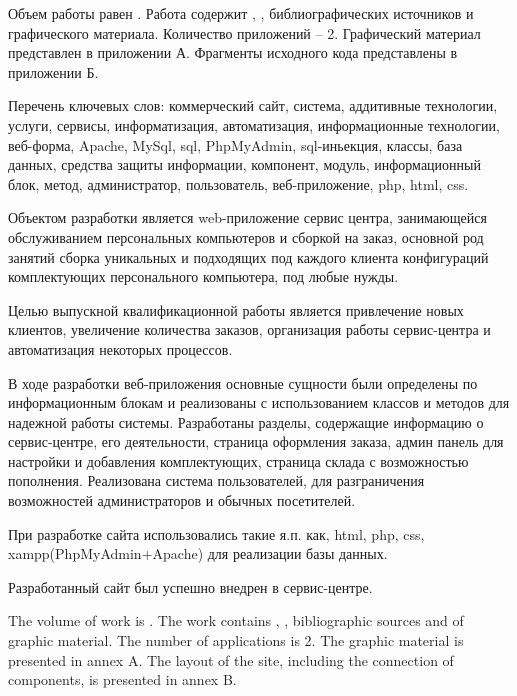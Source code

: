 
Объем работы равен . Работа содержит , ,  библиографических источников и  графического материала. Количество приложений – 2. Графический материал представлен в приложении А. Фрагменты исходного кода представлены в приложении Б.

Перечень ключевых слов: коммерческий сайт, система, аддитивные технологии, услуги, сервисы, информатизация, автоматизация, информационные технологии, веб-форма,  Apache, MySql, sql, PhpMyAdmin, sql-иньекция, классы, база данных, средства защиты информации, компонент, модуль, информационный блок, метод,  администратор, пользователь, веб-приложение, php, html, css.

Объектом разработки является web-приложение сервис центра,  занимающейся обслуживанием персональных компьютеров и сборкой на заказ, основной род занятий сборка уникальных и подходящих под каждого клиента конфигураций комплектующих персонального компьютера, под любые нужды.

Целью выпускной квалификационной работы является привлечение новых клиентов, увеличение количества заказов, организация работы сервис-центра и автоматизация некоторых процессов.

В ходе разработки веб-приложения основные сущности были определены по информационным блокам и реализованы с использованием классов и методов для надежной работы системы. Разработаны разделы, содержащие информацию о сервис-центре, его деятельности, страница оформления заказа, админ панель для настройки и добавления комплектующих, страница склада с возможностью пополнения. Реализована система пользователей, для разграничения возможностей администраторов и обычных посетителей.

При разработке сайта использовались такие я.п. как, html, php, css, xampp(PhpMyAdmin+Apache) для реализации базы данных.

Разработанный сайт был успешно внедрен в сервис-центре.

  
The volume of work is . The work contains , ,  bibliographic sources and  of graphic material. The number of applications is 2. The graphic material is presented in annex A. The layout of the site, including the connection of components, is presented in annex B.

